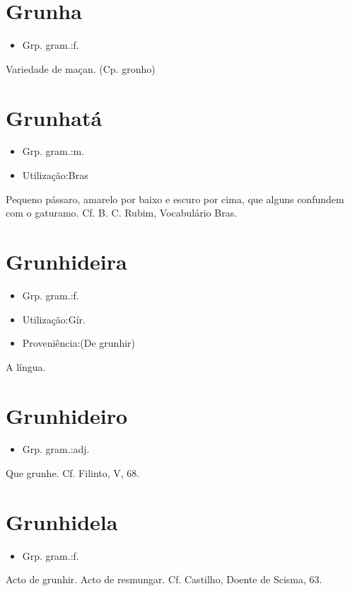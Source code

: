\section{Grunha}
\begin{itemize}
\item {Grp. gram.:f.}
\end{itemize}
Variedade de maçan.
(Cp. \textunderscore gronho\textunderscore )
\section{Grunhatá}
\begin{itemize}
\item {Grp. gram.:m.}
\end{itemize}
\begin{itemize}
\item {Utilização:Bras}
\end{itemize}
Pequeno pássaro, amarelo por baixo e escuro por cima, que alguns confundem com o gaturamo. Cf. B. C. Rubim, \textunderscore Vocabulário Bras.\textunderscore 
\section{Grunhideira}
\begin{itemize}
\item {Grp. gram.:f.}
\end{itemize}
\begin{itemize}
\item {Utilização:Gír.}
\end{itemize}
\begin{itemize}
\item {Proveniência:(De \textunderscore grunhir\textunderscore )}
\end{itemize}
A língua.
\section{Grunhideiro}
\begin{itemize}
\item {Grp. gram.:adj.}
\end{itemize}
Que grunhe. Cf. Filinto, V, 68.
\section{Grunhidela}
\begin{itemize}
\item {Grp. gram.:f.}
\end{itemize}
Acto de grunhir.
Acto de resmungar. Cf. Castilho, \textunderscore Doente de Scisma\textunderscore , 63.
